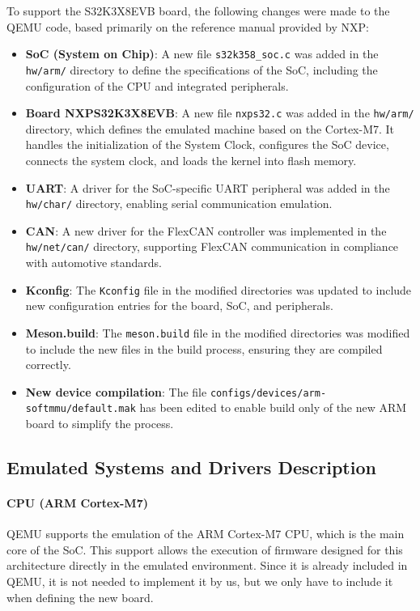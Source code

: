 To support the S32K3X8EVB board, the following changes were made to the QEMU code, based primarily on the reference manual \cite{nxpS32K3} provided by NXP:

\begin{itemize}
    \item \textbf{SoC (System on Chip)}: A new file \texttt{s32k358\_soc.c} was added in the \texttt{hw/arm/} directory to define the specifications of the SoC, including the configuration of the CPU and integrated peripherals.
    \item \textbf{Board NXPS32K3X8EVB}: A new file \texttt{nxps32.c} was added in the \texttt{hw/arm/} directory, which defines the emulated machine based on the Cortex-M7. It handles the initialization of the System Clock, configures the SoC device, connects the system clock, and loads the kernel into flash memory.
    \item \textbf{UART}: A driver for the SoC-specific UART peripheral was added in the \texttt{hw/char/} directory, enabling serial communication emulation.
    \item \textbf{CAN}: A new driver for the FlexCAN controller was implemented in the \texttt{hw/net/can/} directory, supporting FlexCAN communication in compliance with automotive standards.
    \item \textbf{Kconfig}: The \texttt{Kconfig} file in the modified directories was updated to include new configuration entries for the board, SoC, and peripherals.
    \item \textbf{Meson.build}: The \texttt{meson.build} file in the modified directories was modified to include the new files in the build process, ensuring they are compiled correctly.
    \item \textbf{New device compilation}: The file \texttt{configs/devices/arm-softmmu/default.mak} has been edited to enable build only of the new ARM board to simplify the process.
\end{itemize}


\subsection{Emulated Systems and Drivers Description}

\paragraph{CPU (ARM Cortex-M7)}
QEMU supports the emulation of the ARM Cortex-M7 CPU, which is the main core of the SoC. This support allows the execution of firmware designed for this architecture directly in the emulated environment. Since it is already included in QEMU, it is not needed to implement it by us, but we only have to include it when defining the new board.

